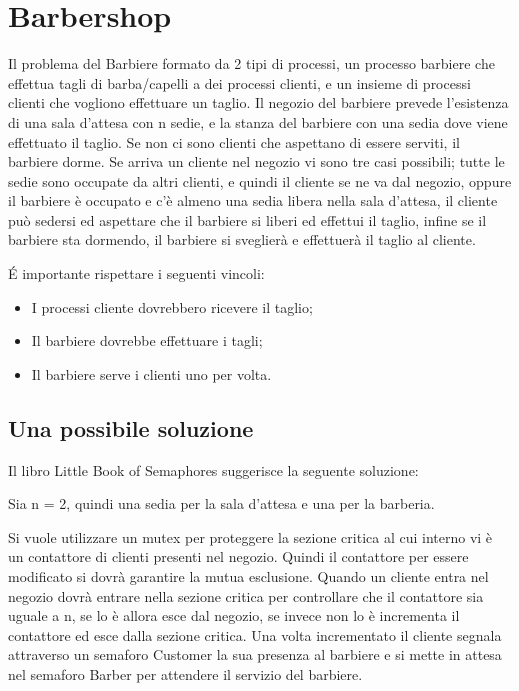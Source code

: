 \section{Barbershop}
Il problema del Barbiere formato da 2 tipi di processi, un processo barbiere che effettua tagli di barba/capelli a dei processi clienti, e un insieme di processi clienti che vogliono effettuare un taglio. Il negozio del barbiere prevede l'esistenza di una sala d'attesa con n sedie, e la stanza del barbiere con una sedia dove viene effettuato il taglio. Se non ci sono clienti che aspettano di essere serviti, il barbiere dorme. Se arriva un cliente nel negozio vi sono tre casi possibili; tutte le sedie sono occupate da altri clienti, e quindi il cliente se ne va dal negozio, oppure il barbiere è occupato e c'è almeno una sedia libera nella sala d'attesa, il cliente può sedersi ed aspettare che il barbiere si liberi ed effettui il taglio, infine se il barbiere sta dormendo, il barbiere si sveglierà e effettuerà il taglio al cliente.

É importante rispettare i seguenti vincoli:

\begin{itemize}
	\item I processi cliente dovrebbero ricevere il taglio;
	\item Il barbiere dovrebbe effettuare i tagli;
	\item Il barbiere serve i clienti uno per volta.
	
\end{itemize}

\subsection{Una possibile soluzione}
Il libro Little Book of Semaphores suggerisce la seguente soluzione: 

Sia n = 2, quindi una sedia per la sala d'attesa e una per la barberia. 

Si vuole utilizzare un \textsf{mutex} per proteggere la sezione critica al cui interno vi è un contattore di clienti presenti nel negozio. Quindi il contattore per essere modificato si dovrà garantire la mutua esclusione. Quando un cliente entra nel negozio dovrà entrare nella sezione critica per controllare che il contattore sia uguale a n, se lo è allora esce dal negozio, se invece non lo è incrementa il contattore ed esce dalla sezione critica. Una volta incrementato il cliente segnala attraverso un semaforo \textsf{Customer} la sua presenza al barbiere e si mette in attesa nel semaforo \textsf{Barber} per attendere il servizio del barbiere.

